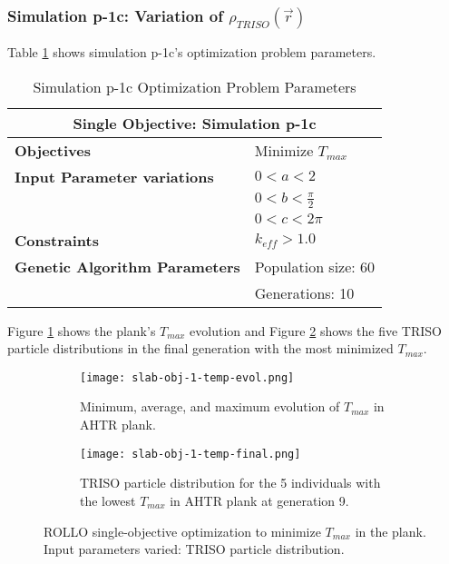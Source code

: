 \subsubsection{Simulation p-1c: Variation of $\rho_{TRISO}(\vec{r})$}
Table \ref{tab:simulation1c} shows simulation p-1c's optimization problem parameters. 
\begin{table}[htbp]
    \centering
    \onehalfspacing
    \caption{Simulation p-1c Optimization Problem Parameters}
	\label{tab:simulation1c}
    \footnotesize
    \begin{tabular}{l|p{3cm}}
    \hline 
    \multicolumn{2}{c}{\textbf{Single Objective: Simulation p-1c}} \\
    \hline 
    \textbf{Objectives} & Minimize $T_{max}$ \\
    \hline 
    \textbf{Input Parameter variations} & $0<a<2$ \\
    & $0<b<\frac{\pi}{2}$ \\
    & $0<c<2\pi$ \\
    \hline
    \textbf{Constraints} & $k_{eff} > 1.0$\\ 
    \hline 
    \textbf{Genetic Algorithm Parameters} & Population size: 60 \\
    & Generations: 10 \\
    \hline
    \end{tabular}
\end{table}
Figure \ref{fig:slab-obj-1-temp-evol} shows the plank's $T_{max}$ evolution 
and Figure \ref{fig:slab-obj-1-temp-final} shows the five TRISO particle 
distributions in the final generation with the most minimized $T_{max}$.
\begin{figure}[htbp]
    \centering
    \begin{subfigure}{\textwidth}
        \texttt{[image: slab-obj-1-temp-evol.png]}
        \caption{Minimum, average, and maximum evolution of $T_{max}$ in 
        AHTR plank.}
        \label{fig:slab-obj-1-temp-evol} 
    \end{subfigure}
    \begin{subfigure}{\textwidth}
        \texttt{[image: slab-obj-1-temp-final.png]}
        \caption{TRISO particle distribution for the 5 individuals with the 
        lowest $T_{max}$ in AHTR plank at generation 9.}
        \label{fig:slab-obj-1-temp-final} 
    \end{subfigure}
    \caption{ROLLO single-objective optimization to minimize $T_{max}$ 
    in the plank. Input parameters varied: TRISO particle distribution.}
    \label{fig:slab-obj-1-temp}
\end{figure}
